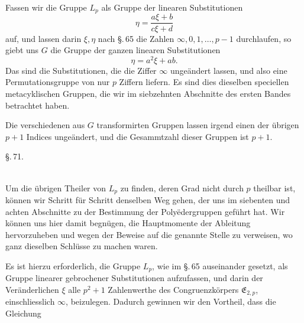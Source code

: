 Fassen wir die Gruppe $L_p$ als Gruppe der linearen Substitutionen
\[
\eta = \frac{a\xi+b}{c\xi+d}
\]
auf, und lassen darin $\xi, \eta$ nach \S.\,65 die Zahlen $\infty, 0, 1, \ldots, p-1$ durchlaufen, so giebt uns $G$ die Gruppe der ganzen linearen Substitutionen
\[
\eta = a^2\xi + ab.
\]
Das sind die Substitutionen, die die Ziffer $\infty$ ungeändert lassen, und also eine Permutationsgruppe von nur $p$ Ziffern liefern. Es sind dies dieselben speciellen metacyklischen Gruppen, die wir im siebzehnten Abschnitte des ersten Bandes betrachtet haben.

Die verschiedenen aus $G$ transformirten Gruppen lassen irgend einen der übrigen $p+1$ Indices ungeändert, und die Gesammtzahl dieser Gruppen ist $p+1$.

\begin{center}
\S.\,71.\\
\\
\end{center}

Um die übrigen Theiler von $L_p$ zu finden, deren Grad nicht durch $p$ theilbar ist, können wir Schritt für Schritt denselben Weg gehen, der uns im siebenten und achten Abschnitte zu der Bestimmung der Polyëdergruppen geführt hat. Wir können uns hier damit begnügen, die Hauptmomente der Ableitung hervorzuheben und wegen der Beweise auf die genannte Stelle zu verweisen, wo ganz dieselben Schlüsse zu machen waren.

Es ist hierzu erforderlich, die Gruppe $L_p$, wie im \S.\,65 auseinander gesetzt, als Gruppe linearer gebrochener Substitutionen
aufzufassen, und darin der Veränderlichen $\xi$ alle $p^2+1$ Zahlenwerthe des Congruenzkörpers $\mathfrak{E}_{2,p}$, einschliesslich $\infty$, beizulegen. Dadurch gewinnen wir den Vortheil, dass die Gleichung
